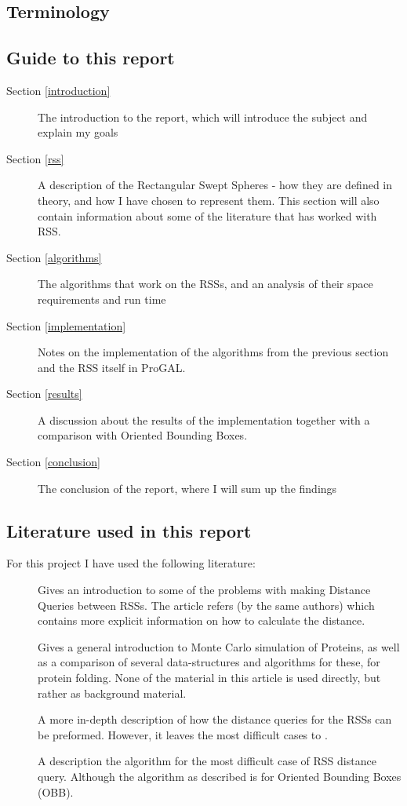 \subsection{Terminology}

\subsection{Guide to this report}
\begin{description}
\item[Section \ref{introduction}] The introduction to the report, which will introduce the subject and explain my goals
\item[Section \ref{rss}] A description of the Rectangular Swept Spheres - how they are defined in theory, and how I have chosen to represent them. This section will also contain information about some of the literature that has worked with RSS. 
\item[Section \ref{algorithms}] The algorithms that work on the RSSs, and an analysis of their space requirements and run time 
\item[Section \ref{implementation}] Notes on the implementation of the algorithms from the previous section and the RSS itself in ProGAL.
\item[Section \ref{results}] A discussion about the results of the implementation together with a comparison with Oriented Bounding Boxes. 
\item[Section \ref{conclusion}] The conclusion of the report, where I will sum up the findings 
\end{description}

\subsection{Literature used in this report}
For this project I have used the following literature:
\begin{description}
\item[\cite{larsen00fast}] Gives an introduction to some of the problems with making Distance Queries between RSSs. The article refers \cite{Larsen99fastproximity} (by the same authors) which contains more explicit information on how to calculate the distance. 
\item[\cite{Lotan03algorithmand}] Gives a general introduction to Monte Carlo simulation of Proteins, as well as a comparison of several data-structures and algorithms for these, for protein folding. None of the material in this article is used directly, but rather as background material.
\item[\cite{Larsen99fastproximity}] A more in-depth description of how the distance queries for the RSSs can be preformed. However, it leaves the most difficult cases to \cite{237244}.
\item[\cite{237244}] A description the algorithm for the most difficult case of RSS distance query. Although the algorithm as described is for Oriented Bounding Boxes (OBB).
\end{description}
